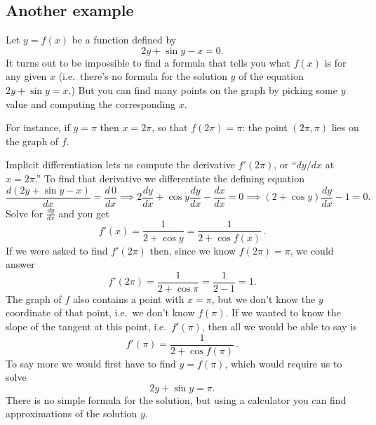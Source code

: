 \subsection{Another example} 
Let $y=f(x)$ be a function defined by
\[
2y+\sin y - x=0.
\]
It turns out to be impossible to find a formula that tells you what
$f(x)$ is for any given $x$ (i.e.~there's no formula for the solution
$y$ of the equation $2y+\sin y =x$.)  But you can find many points on
the graph by picking some $y$ value and computing the corresponding
$x$.




For instance, if $y=\pi$ then $x=2\pi$, so that $f(2\pi) = \pi$:  the
point $(2\pi, \pi)$ lies on the graph of $f$.




Implicit differentiation lets us compute the derivative $f'(2\pi)$, or
``$dy/dx$ at $x=2\pi$.''  To find that derivative we differentiate the
defining equation
\[
\frac{d(2y+\sin y - x)}{dx} = \frac{d\,0}{dx}
\implies
2\frac{dy}{dx}+\cos y \frac{dy}{dx} - \frac{dx}{dx} = 0
\implies
(2+\cos y) \frac{dy}{dx} -1 =0.
\]%
%
Solve for $\frac{dy}{dx}$ and you get
\[
f'(x) = \frac{1}{2+\cos y} = \frac1{2+\cos f(x)}\,.
\]
If we were asked to find $f'(2\pi)$ then, since we know $f(2\pi) = \pi$, we
could answer
\[
f'(2\pi) = \frac1{2+\cos \pi} = \frac1{2-1} = 1.
\]
The graph of $f$ also contains a point with $x=\pi$, but we don't know
the $y$ coordinate of that point, i.e.~we don't know $f(\pi)$.  If we
wanted to know the slope of the tangent at this point, i.e.~$f'(\pi)$,
then all we would be able to say is
\[
f'(\pi) = \frac1{2+\cos f(\pi)}\,.
\]
To say more we would first have to find $y=f(\pi)$, which would
require us to solve
\[
2y+\sin y = \pi.
\]
There is no simple formula for the solution, but using a calculator
you can find approximations of the solution $y$.




